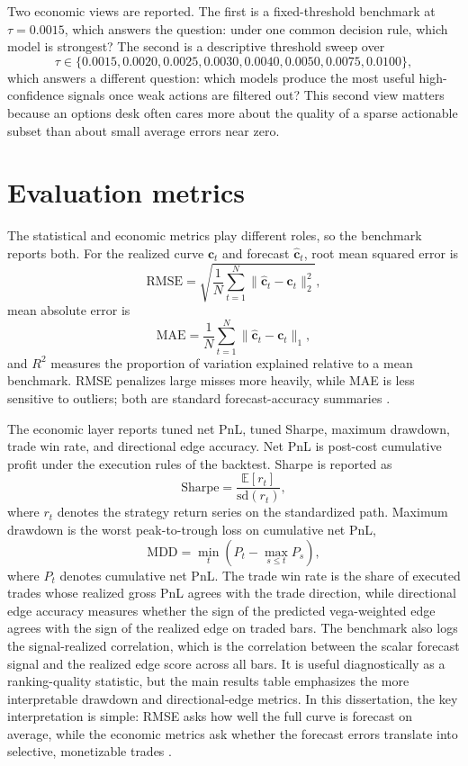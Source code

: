 \documentclass[12pt]{report}
\begin{document}
Two economic views are reported. The first is a fixed-threshold benchmark at \(\tau=0.0015\), which answers the question: under one common decision rule, which model is strongest? The second is a descriptive threshold sweep over
\[
\tau \in \{0.0015,0.0020,0.0025,0.0030,0.0040,0.0050,0.0075,0.0100\},
\]
which answers a different question: which models produce the most useful high-confidence signals once weak actions are filtered out? This second view matters because an options desk often cares more about the quality of a sparse actionable subset than about small average errors near zero.

\section{Evaluation metrics}
The statistical and economic metrics play different roles, so the benchmark reports both. For the realized curve \(\mathbf{c}_t\) and forecast \(\hat{\mathbf{c}}_t\), root mean squared error is
\[
\mathrm{RMSE}=\sqrt{\frac{1}{N}\sum_{t=1}^{N}\lVert \hat{\mathbf{c}}_t-\mathbf{c}_t\rVert_2^2},
\]
mean absolute error is
\[
\mathrm{MAE}=\frac{1}{N}\sum_{t=1}^{N}\lVert \hat{\mathbf{c}}_t-\mathbf{c}_t\rVert_1,
\]
and \(R^2\) measures the proportion of variation explained relative to a mean benchmark. RMSE penalizes large misses more heavily, while MAE is less sensitive to outliers; both are standard forecast-accuracy summaries \citep{hyndman2006}.

The economic layer reports tuned net PnL, tuned Sharpe, maximum drawdown, trade win rate, and directional edge accuracy. Net PnL is post-cost cumulative profit under the execution rules of the backtest. Sharpe is reported as
\[
\mathrm{Sharpe}=\frac{\mathbb{E}[r_t]}{\mathrm{sd}(r_t)},
\]
where \(r_t\) denotes the strategy return series on the standardized path. Maximum drawdown is the worst peak-to-trough loss on cumulative net PnL,
\[
\mathrm{MDD}=\min_t\left(P_t-\max_{s\le t}P_s\right),
\]
where \(P_t\) denotes cumulative net PnL. The trade win rate is the share of executed trades whose realized gross PnL agrees with the trade direction, while directional edge accuracy measures whether the sign of the predicted vega-weighted edge agrees with the sign of the realized edge on traded bars. The benchmark also logs the signal-realized correlation, which is the correlation between the scalar forecast signal and the realized edge score across all bars. It is useful diagnostically as a ranking-quality statistic, but the main results table emphasizes the more interpretable drawdown and directional-edge metrics. In this dissertation, the key interpretation is simple: RMSE asks how well the full curve is forecast on average, while the economic metrics ask whether the forecast errors translate into selective, monetizable trades \citep{sharpe1994}.
\end{document}
